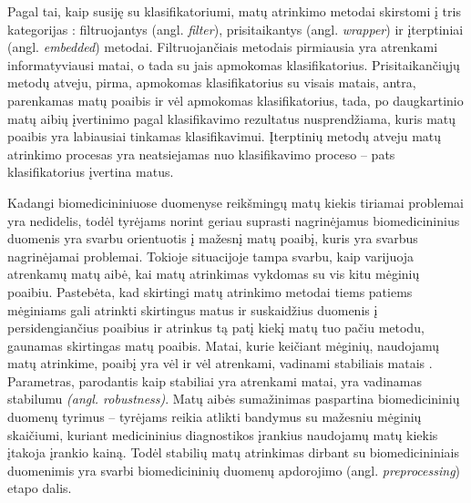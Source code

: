 Pagal tai, kaip susiję su klasifikatoriumi, matų atrinkimo metodai skirstomi į tris kategorijas \cite{saeys2008robust}: filtruojantys (angl. \textit{filter}), prisitaikantys (angl. \textit{wrapper}) ir įterptiniai (angl. \textit{embedded}) metodai. Filtruojančiais metodais pirmiausia yra atrenkami informatyviausi matai, o tada su jais apmokomas klasifikatorius. Prisitaikančiųjų metodų atveju, pirma, apmokomas klasifikatorius su visais matais, antra, parenkamas matų poaibis ir vėl apmokomas klasifikatorius, tada, po daugkartinio matų aibių įvertinimo pagal klasifikavimo rezultatus nusprendžiama, kuris matų poaibis yra labiausiai tinkamas klasifikavimui. Įterptinių metodų atveju matų atrinkimo procesas yra neatsiejamas nuo klasifikavimo proceso -- pats klasifikatorius įvertina matus.




Kadangi biomedicininiuose duomenyse reikšmingų matų kiekis tiriamai problemai yra nedidelis, todėl tyrėjams norint geriau suprasti nagrinėjamus biomedicininius duomenis yra svarbu orientuotis į mažesnį matų poaibį, kuris yra svarbus nagrinėjamai problemai. Tokioje situacijoje tampa svarbu, kaip varijuoja atrenkamų matų aibė, kai matų atrinkimas vykdomas su vis kitu mėginių poaibiu. Pastebėta, kad skirtingi matų atrinkimo metodai tiems patiems mėginiams gali atrinkti skirtingus matus ir suskaidžius duomenis į persidengiančius poaibius ir atrinkus tą patį kiekį matų tuo pačiu metodu, gaunamas skirtingas matų poaibis.  Matai, kurie keičiant mėginių, naudojamų matų atrinkime, poaibį yra vėl ir vėl atrenkami, vadinami stabiliais matais \cite{devijver1982pattern}. Parametras, parodantis kaip stabiliai yra atrenkami matai, yra vadinamas stabilumu \textit{(angl. robustness)}. Matų aibės sumažinimas paspartina biomedicininių duomenų tyrimus -- tyrėjams reikia atlikti bandymus su mažesniu mėginių skaičiumi, kuriant 
medicininius diagnostikos įrankius naudojamų matų kiekis įtakoja įrankio kainą. Todėl stabilių matų atrinkimas dirbant su biomedicininiais duomenimis yra svarbi biomedicininių duomenų apdorojimo (angl. \textit{preprocessing}) etapo dalis.

